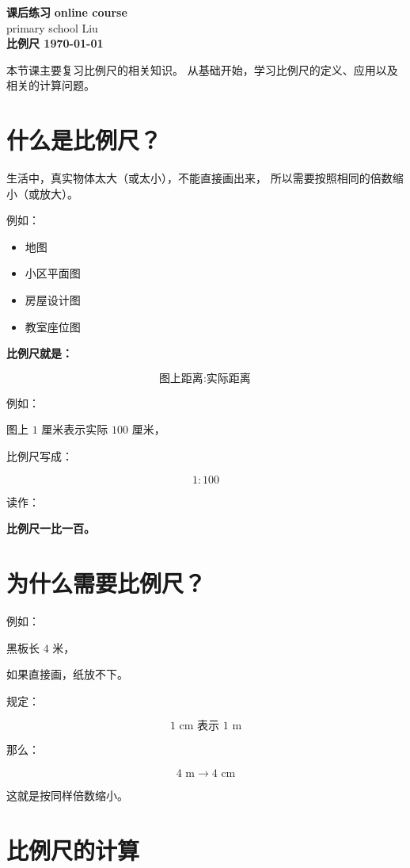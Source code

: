 \documentclass[DIN, pagenumber=false, fontsize=11pt, parskip=half]{scrartcl}
\newcommand{\mytitle}[1]{{\noindent\Large\textbf{#1}}}
\begin{document}
\noindent\textbf{课后练习} \hfill \textbf{online course}\\
primary school \hfill Liu\\

\mytitle{比例尺 \hfill \today}
\newline
\begin{parchmentquote}
    本节课主要复习比例尺的相关知识。
    从基础开始，学习比例尺的定义、应用以及相关的计算问题。


\end{parchmentquote}

\section{什么是比例尺？}

生活中，真实物体太大（或太小），不能直接画出来，
所以需要按照相同的倍数缩小（或放大）。

例如：

\begin{itemize}
    \item 地图
    \item 小区平面图
    \item 房屋设计图
    \item 教室座位图
\end{itemize}

\textbf{比例尺就是：}

\[
\text{图上距离} : \text{实际距离}
\]

例如：

图上 $1$ 厘米表示实际 $100$ 厘米，

比例尺写成：

\[
1:100
\]

读作：

\textbf{比例尺一比一百。}

\section{为什么需要比例尺？}

例如：

黑板长 $4$ 米，

如果直接画，纸放不下。

规定：

\[
1\text{ cm 表示 }1\text{ m}
\]

那么：

\[
4\text{ m}\rightarrow 4\text{ cm}
\]

这就是按同样倍数缩小。

\section{比例尺的计算}
\end{document}
